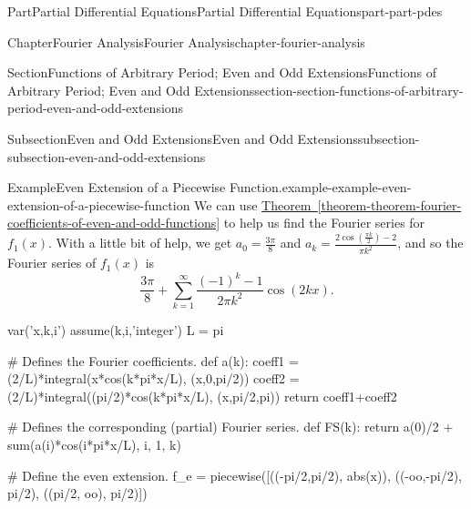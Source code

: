 \documentclass[twoside,10pt,]{book}
\newcommand{\xreffont}{\relax}
\numberwithin{equation}{part}
\begin{document}
\begin{partptx}{Part}{Partial Differential Equations}{}{Partial Differential Equations}{}{}{part-part-pdes}
\begin{chapterptx}{Chapter}{Fourier Analysis}{}{Fourier Analysis}{}{}{chapter-fourier-analysis}
\begin{sectionptx}{Section}{Functions of Arbitrary Period; Even and Odd Extensions}{}{Functions of Arbitrary Period; Even and Odd Extensions}{}{}{section-section-functions-of-arbitrary-period-even-and-odd-extensions}
\begin{subsectionptx}{Subsection}{Even and Odd Extensions}{}{Even and Odd Extensions}{}{}{subsection-subsection-even-and-odd-extensions}
\begin{example}{Example}{Even Extension of a Piecewise Function.}{example-example-even-extension-of-a-piecewise-function}
We can use \hyperref[theorem-theorem-fourier-coefficients-of-even-and-odd-functions]{Theorem~{\xreffont\ref{theorem-theorem-fourier-coefficients-of-even-and-odd-functions}}} to help us find the Fourier series for \(f_{1}(x)\). With a little bit of help, we get \(a_{0} = \frac{3\pi}{8}\) and \(a_{k} = \frac{2\cos(\frac{\pi k}{2})-2}{\pi k^{2}}\), and so the Fourier series of \(f_{1}(x)\) is%
\begin{equation*}
\frac{3\pi}{8}+\sum_{k=1}^{\infty}\frac{(-1)^{k}-1}{2\pi k^{2}}\cos(2kx).
\end{equation*}
%
\end{example}
\begin{sageinput}
var('x,k,i')
assume(k,i,'integer')
L = pi

# Defines the Fourier coefficients.
def a(k):
  coeff1 = (2/L)*integral(x*cos(k*pi*x/L), (x,0,pi/2))
  coeff2 = (2/L)*integral((pi/2)*cos(k*pi*x/L), (x,pi/2,pi))
  return coeff1+coeff2

# Defines the corresponding (partial) Fourier series.
def FS(k):
  return a(0)/2 + sum(a(i)*cos(i*pi*x/L), i, 1, k)

# Define the even extension.
f_e = piecewise([((-pi/2,pi/2), abs(x)), ((-oo,-pi/2), pi/2), ((pi/2, oo), pi/2)])


\end{sageinput}
\end{subsectionptx}
\end{sectionptx}
\end{chapterptx}
\end{partptx}
\end{document}
